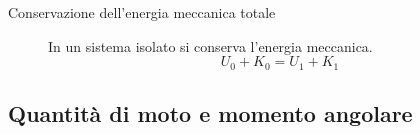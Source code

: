 \documentclass[a4paper,11pt,italian]{article}
\begin{document}
\begin{description}
%   
  
  \item[Conservazione dell'energia meccanica totale] 
  In un sistema isolato si conserva l'energia meccanica. 
  \[ U_0 + K_0 = U_1 + K_1 \]
\end{description}



\subsection{Quantità di moto e momento angolare}
\end{document}
